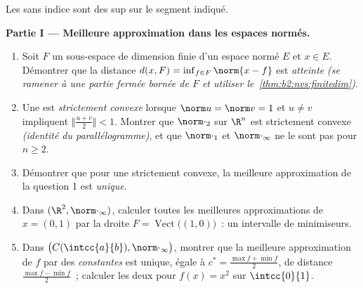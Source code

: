 \begin{problem}
\label{pb:b2:nvs:1}
Les  sans indice sont des  sup sur le segment indiqué.

\medskip
\noindent\textbf{Partie I --- Meilleure approximation dans les espaces
normés.}
\begin{enumerate}
  \item Soit $F$ un sous-espace de dimension finie d'un espace normé
        $E$ et $x \in E$. Démontrer que la distance $d(x,
        F) = \inf_{f \in F}\norm{x - f}$ est \emph{atteinte}
        \emph{(se ramener à une partie fermée bornée de $F$ et utiliser
        le~\cref{thm:b2:nvs:finitedim})}.
  \item Une  est \emph{strictement convexe} lorsque $\norm u = \norm v
        = 1$ et $u \neq v$ impliquent $\bigl\Vert\frac{u +
        v}2\bigr\Vert < 1$. Montrer que $\norm\cdot_2$ sur $\R^n$
        est strictement convexe \emph{(identité du parallélogramme)}, et
        que $\norm\cdot_1$ et $\norm\cdot_\infty$ ne le sont pas pour
        $n \geq 2$.
  \item Démontrer que pour une  strictement convexe, la meilleure
        approximation de la question 1 est \emph{unique}.
  \item Dans $(\R^2, \norm\cdot_\infty)$, calculer toutes les meilleures
        approximations de $x = (0, 1)$ par la droite $F =
        \operatorname{Vect}\bigl((1,0)\bigr)$~: un intervalle de
        minimiseurs.
  \item Dans $\bigl(C(\intcc{a}{b}), \norm\cdot_\infty\bigr)$,
        montrer que la meilleure approximation de $f$ par des
        \emph{constantes} est unique, égale à $c^* = \frac{\max f
        + \min f}{2}$, de distance $\frac{\max f - \min
        f}{2}$~; calculer les deux pour $f(x) = x^2$ sur
        $\intcc{0}{1}$.
\end{enumerate}


\end{problem}
